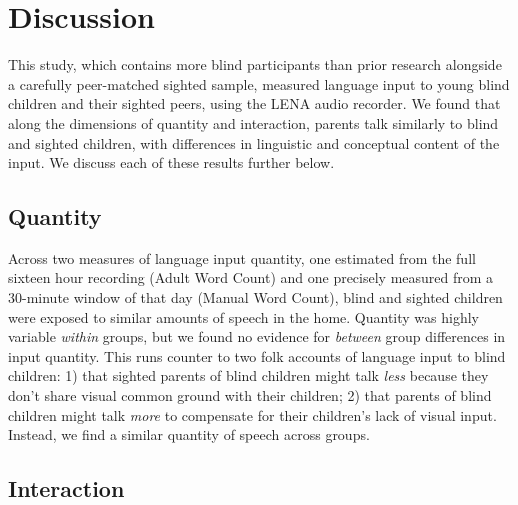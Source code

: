 \documentclass[
  man]{apa6}
\begin{document}
\hypertarget{discussion}{%
\section{Discussion}\label{discussion}}

This study, which contains more blind participants than prior research alongside a carefully peer-matched sighted sample, measured language input to young blind children and their sighted peers, using the LENA audio recorder. We found that along the dimensions of quantity and interaction, parents talk similarly to blind and sighted children, with differences in linguistic and conceptual content of the input. We discuss each of these results further below.

\hypertarget{quantity-1}{%
\subsection{Quantity}\label{quantity-1}}

Across two measures of language input quantity, one estimated from the full sixteen hour recording (Adult Word Count) and one precisely measured from a 30-minute window of that day (Manual Word Count), blind and sighted children were exposed to similar amounts of speech in the home. Quantity was highly variable \emph{within} groups, but we found no evidence for \emph{between} group differences in input quantity. This runs counter to two folk accounts of language input to blind children: 1) that sighted parents of blind children might talk \emph{less} because they don't share visual common ground with their children; 2) that parents of blind children might talk \emph{more} to compensate for their children's lack of visual input. Instead, we find a similar quantity of speech across groups.

\hypertarget{interaction-2}{%
\subsection{Interaction}\label{interaction-2}}
\end{document}
